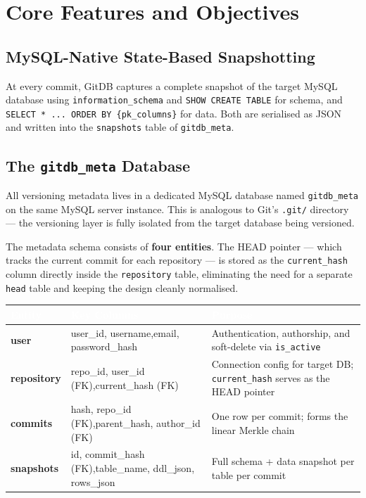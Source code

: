 \documentclass[12pt, a4paper]{article}
\begin{document}
\section{Core Features and Objectives}

\subsection{MySQL-Native State-Based Snapshotting}

At every commit, GitDB captures a complete snapshot of the target MySQL database
using \texttt{information\_schema} and \texttt{SHOW CREATE TABLE} for schema, and
\texttt{SELECT * ... ORDER BY \{pk\_columns\}} for data. Both are serialised as JSON
and written into the \texttt{snapshots} table of \texttt{gitdb\_meta}.

\subsection{The \texttt{gitdb\_meta} Database}

All versioning metadata lives in a dedicated MySQL database named
\texttt{gitdb\_meta} on the same MySQL server instance. This is analogous to
Git's \texttt{.git/} directory --- the versioning layer is fully isolated from
the target database being versioned.

The metadata schema consists of \textbf{four entities}. The HEAD pointer ---
which tracks the current commit for each repository --- is stored as the
\texttt{current\_hash} column directly inside the \texttt{repository} table,
eliminating the need for a separate \texttt{head} table and keeping the design
cleanly normalised.

\vspace{0.5em}
\renewcommand{\arraystretch}{1.4}
\begin{tabularx}{\textwidth}{>{\bfseries}p{3cm} >{\ttfamily}p{4.5cm} X}
\rowcolor{tableheader}
\textcolor{white}{\normalfont\bfseries Entity} &
\textcolor{white}{\normalfont\bfseries Key Columns} &
\textcolor{white}{\normalfont\bfseries Purpose} \\
\midrule
user       & user\_id, username,\newline email, password\_hash    & Authentication, authorship, and soft-delete via \texttt{is\_active} \\
\rowcolor{lightgray}
repository & repo\_id, user\_id (FK),\newline current\_hash (FK)  & Connection config for target DB; \texttt{current\_hash} serves as the HEAD pointer \\
commits    & hash, repo\_id (FK),\newline parent\_hash, author\_id (FK) & One row per commit; forms the linear Merkle chain \\
\rowcolor{lightgray}
snapshots  & id, commit\_hash (FK),\newline table\_name, ddl\_json, rows\_json & Full schema + data snapshot per table per commit \\
\end{tabularx}
\vspace{0.5em}
\end{document}
